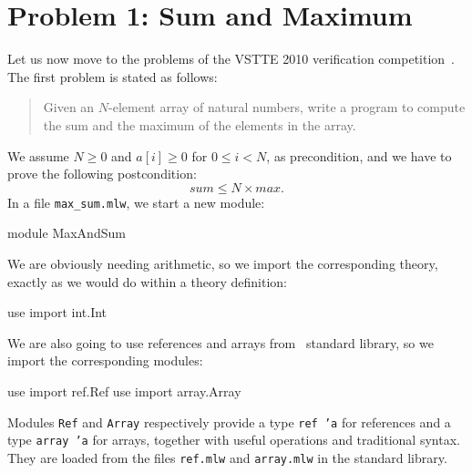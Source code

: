 \section{Problem 1: Sum and Maximum}
\label{sec:MaxAndSum}

Let us now move to the problems of the VSTTE 2010  verification
competition~\cite{vstte10comp}.
The first problem is stated as follows:
\begin{quote}
  Given an $N$-element array of natural numbers,
  write a program to compute the sum and the maximum of the
  elements in the array.
\end{quote}
We  assume $N \ge 0$ and $a[i] \ge 0$ for $0 \le i < N$, as precondition,
and we have to prove the following postcondition:
\begin{displaymath}
  sum \le N \times max.
\end{displaymath}
In a file \verb|max_sum.mlw|, we start a new module:
\begin{whycode}
module MaxAndSum
\end{whycode}
We are obviously needing arithmetic, so we import the corresponding
theory, exactly as we would do within a theory definition:
\begin{whycode}
  use import int.Int
\end{whycode}
We are also going to use references and arrays from \why\ standard
library, so we import the corresponding modules:
\begin{whycode}
  use import ref.Ref
  use import array.Array
\end{whycode}
Modules \texttt{Ref} and \texttt{Array} respectively provide a type
\texttt{ref 'a} for references and a type \texttt{array 'a} for
arrays, together with useful
operations and traditional syntax. They are loaded from the \whyml
files \texttt{ref.mlw} and \texttt{array.mlw} in the standard library.

